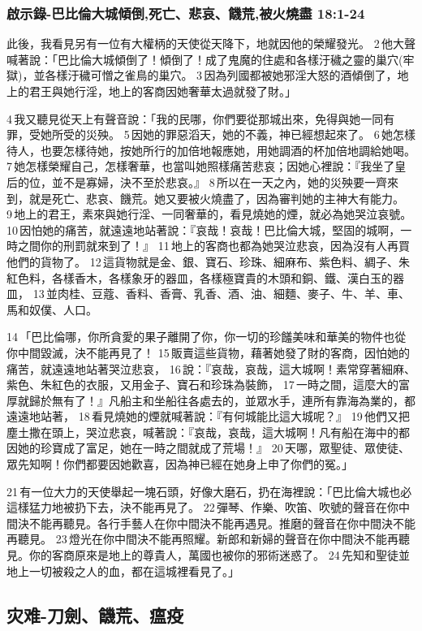 \subsubsection{啟示錄-巴比倫大城傾倒,死亡、悲哀、饑荒,被火燒盡 18:1-24}
此後，我看見另有一位有大權柄的天使從天降下，地就因他的榮耀發光。 2 他大聲喊著說：「巴比倫大城傾倒了！傾倒了！成了鬼魔的住處和各樣汙穢之靈的巢穴(牢獄)，並各樣汙穢可憎之雀鳥的巢穴。 3 因為列國都被她邪淫大怒的酒傾倒了，地上的君王與她行淫，地上的客商因她奢華太過就發了財。」

4 我又聽見從天上有聲音說：「我的民哪，你們要從那城出來，免得與她一同有罪，受她所受的災殃。 5 因她的罪惡滔天，她的不義，神已經想起來了。 6 她怎樣待人，也要怎樣待她，按她所行的加倍地報應她，用她調酒的杯加倍地調給她喝。 7 她怎樣榮耀自己，怎樣奢華，也當叫她照樣痛苦悲哀；因她心裡說：『我坐了皇后的位，並不是寡婦，決不至於悲哀。』 8 所以在一天之內，她的災殃要一齊來到，就是死亡、悲哀、饑荒。她又要被火燒盡了，因為審判她的主神大有能力。 9 地上的君王，素來與她行淫、一同奢華的，看見燒她的煙，就必為她哭泣哀號。 10 因怕她的痛苦，就遠遠地站著說：『哀哉！哀哉！巴比倫大城，堅固的城啊，一時之間你的刑罰就來到了！』 11 地上的客商也都為她哭泣悲哀，因為沒有人再買他們的貨物了。 12 這貨物就是金、銀、寶石、珍珠、細麻布、紫色料、綢子、朱紅色料，各樣香木，各樣象牙的器皿，各樣極寶貴的木頭和銅、鐵、漢白玉的器皿， 13 並肉桂、豆蔻、香料、香膏、乳香、酒、油、細麵、麥子、牛、羊、車、馬和奴僕、人口。

14 「巴比倫哪，你所貪愛的果子離開了你，你一切的珍饈美味和華美的物件也從你中間毀滅，決不能再見了！ 15 販賣這些貨物，藉著她發了財的客商，因怕她的痛苦，就遠遠地站著哭泣悲哀， 16 說：『哀哉，哀哉，這大城啊！素常穿著細麻、紫色、朱紅色的衣服，又用金子、寶石和珍珠為裝飾， 17 一時之間，這麼大的富厚就歸於無有了！』凡船主和坐船往各處去的，並眾水手，連所有靠海為業的，都遠遠地站著， 18 看見燒她的煙就喊著說：『有何城能比這大城呢？』 19 他們又把塵土撒在頭上，哭泣悲哀，喊著說：『哀哉，哀哉，這大城啊！凡有船在海中的都因她的珍寶成了富足，她在一時之間就成了荒場！』 20 天哪，眾聖徒、眾使徒、眾先知啊！你們都要因她歡喜，因為神已經在她身上申了你們的冤。」

21 有一位大力的天使舉起一塊石頭，好像大磨石，扔在海裡說：「巴比倫大城也必這樣猛力地被扔下去，決不能再見了。 22 彈琴、作樂、吹笛、吹號的聲音在你中間決不能再聽見。各行手藝人在你中間決不能再遇見。推磨的聲音在你中間決不能再聽見。 23 燈光在你中間決不能再照耀。新郎和新婦的聲音在你中間決不能再聽見。你的客商原來是地上的尊貴人，萬國也被你的邪術迷惑了。 24 先知和聖徒並地上一切被殺之人的血，都在這城裡看見了。」

\subsection{灾难-刀劍、饑荒、瘟疫}
